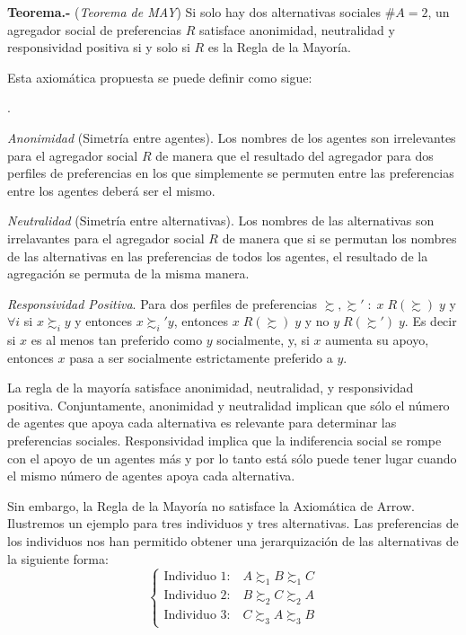 \documentclass[10pt,a4paper]{article}
\newcounter{numitem}
\newenvironment{lnum}
      {\begin{list}{\arabic{numitem}.}{%
          \usecounter{numitem}%
          \setlength{\leftmargin}{1cm}%
          \setlength{\parskip}{3pt}%
          \setlength{\itemsep}{0pt}%
          \setlength{\parsep}{0pt}%
      }}
      {\end{list}}
\newcommand{\authorfont}[1]{{\fontfamily{EBGaramond-TLF}\selectfont #1}}
\begin{document}
\textbf{Teorema.-} (\textit{Teorema de \authorfont{MAY}}) Si solo hay dos alternativas sociales $\#A=2$, un agregador social de preferencias $R$ satisface anonimidad, neutralidad y responsividad positiva si y solo si $R$ es la Regla de la Mayoría. 

Esta axiomática propuesta se puede definir como sigue:
\begin{lnum}
    \item \textit{Anonimidad} (Simetría entre agentes). Los nombres de los agentes son irrelevantes para el agregador social $R$ de manera que el resultado del agregador para dos perfiles de preferencias en los que simplemente se permuten entre las preferencias entre los agentes deberá ser el mismo.
    \item \textit{Neutralidad} (Simetría entre alternativas). Los nombres de las alternativas son irrelavantes para el agregador social $R$ de manera que si se permutan los nombres de las alternativas en las preferencias de todos los agentes, el resultado de la agregación se permuta de la misma manera. 
    \item \textit{Responsividad Positiva}. Para dos perfiles de preferencias $\succsim, \succsim' \; : \; x\; R(\succsim) \; y$  y $\forall i$  si $x\succsim_iy$ y entonces $x\succsim_i'y$, entonces $x\;R(\succsim)\;y$ y no $y \; R(\succsim') \;y$. Es decir si $x$ es al menos tan preferido como $y$ socialmente, y, si $x$ aumenta su apoyo, entonces $x$ pasa a ser socialmente estrictamente preferido a $y$.
\end{lnum}

La regla de la mayoría satisface anonimidad, neutralidad, y responsividad positiva. Conjuntamente, anonimidad y neutralidad implican que sólo el número de agentes que apoya cada alternativa es relevante para determinar las preferencias sociales. Responsividad implica que la indiferencia social se rompe con el apoyo de un agentes más y por lo tanto está sólo puede tener lugar cuando el mismo número de agentes apoya cada alternativa. 

Sin embargo, la Regla de la Mayoría no satisface la Axiomática de Arrow. Ilustremos un ejemplo para tres individuos y tres alternativas. Las preferencias de los individuos nos han permitido obtener una jerarquización de las alternativas de la siguiente forma:
$$\begin{cases}
    \text{Individuo 1:} \quad A\succsim_1 B\succsim_1 C\\[0.7em]
    \text{Individuo 2:} \quad B\succsim_2 C\succsim_2 A\\[0.7em]
    \text{Individuo 3:} \quad C\succsim_3 A\succsim_3 B
\end{cases}$$
\end{document}
